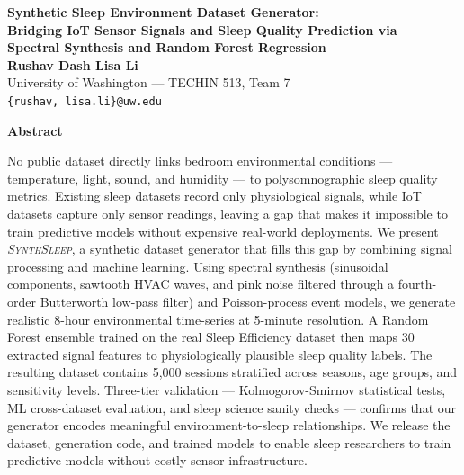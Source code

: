 \documentclass[11pt,a4paper]{article}
\newcommand{\ourmethod}{\textsc{SynthSleep}}
\begin{document}
\begin{center}
  {\fontsize{15}{18}\bfseries Synthetic Sleep Environment Dataset Generator:\\
  Bridging IoT Sensor Signals and Sleep Quality Prediction via\\
  Spectral Synthesis and Random Forest Regression}\\[6pt]
  {\fontsize{12}{14}\bfseries Rushav Dash \quad Lisa Li}\\[2pt]
  {\fontsize{12}{14}\normalfont University of Washington — TECHIN 513, Team 7}\\[2pt]
  {\fontsize{10}{12}\normalfont \texttt{\{rushav, lisa.li\}@uw.edu}}
\end{center}

\begin{center}
  {\fontsize{12}{14}\bfseries Abstract}
\end{center}
{\fontsize{10}{12}\normalfont
No public dataset directly links bedroom environmental conditions — temperature,
light, sound, and humidity — to polysomnographic sleep quality metrics.
Existing sleep datasets record only physiological signals, while IoT datasets
capture only sensor readings, leaving a gap that makes it impossible to train
predictive models without expensive real-world deployments.
We present \textit{\ourmethod{}}, a synthetic dataset generator that fills this gap by
combining signal processing and machine learning.  Using spectral synthesis
(sinusoidal components, sawtooth HVAC waves, and pink noise filtered through a
fourth-order Butterworth low-pass filter) and Poisson-process event models, we
generate realistic 8-hour environmental time-series at 5-minute resolution.
A Random Forest ensemble trained on the real Sleep Efficiency dataset then
maps 30 extracted signal features to physiologically plausible sleep quality
labels.  The resulting dataset contains 5,000 sessions stratified across
seasons, age groups, and sensitivity levels.  Three-tier validation —
Kolmogorov-Smirnov statistical tests, ML cross-dataset evaluation, and
sleep science sanity checks — confirms that our generator encodes meaningful
environment-to-sleep relationships.  We release the dataset, generation code,
and trained models to enable sleep researchers to train predictive models
without costly sensor infrastructure.
}
\end{document}
